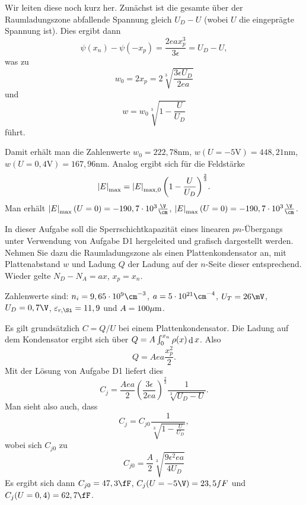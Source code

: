 \documentclass{article}
\begin{document}
\begin{solution}
Wir leiten diese noch kurz her. Zunächst ist die gesamte über der Raumladungszone abfallende Spannung gleich $U_D-U$ (wobei $U$ die eingeprägte Spannung ist). Dies ergibt dann
$$
\psi(x_n)-\psi(-x_p)=\frac{2eax_p^3}{3\epsilon}=U_D-U,
$$
was zu
$$w_0=2x_p=2\sqrt[3]{\frac{3\epsilon U_D}{2ea}}$$
und
$$w=w_0\sqrt[3]{1-\frac{U}{U_D}}$$
führt.

Damit erhält man die Zahlenwerte $w_0=222,78\mathrm{nm}$, $w(U=-5\mathrm{V})=448,21\mathrm{nm}$, $w(U=0,4\mathrm{V})=167,96\mathrm{nm}$.
Analog ergibt sich für die Feldstärke
$$\left|E\right|_{\max}=\left|E\right|_{\max,0}{\left(1-\frac{U}{U_D}\right)}^{\frac{2}{3}}.$$
Man erhält $\abs{E}_{\max} (U=0)=\float{-190,7}{3}\frac{\V}{\cm}$, $\abs{E}_{\max}(U=0)=\float{-190,7}{3}\frac{\V}{\cm}$.
\end{solution}

\begin{exercise}
In dieser Aufgabe soll die Sperrschichtkapazität eines linearen $pn$-Übergangs unter Verwendung von Aufgabe D1 hergeleited und grafisch dargestellt werden. Nehmen Sie dazu die Raumladungszone als einen Plattenkondensator an, mit Plattenabstand $w$ und Ladung $Q$ der Ladung auf der $n$-Seite dieser entsprechend.
Wieder gelte $N_D-N_A=ax$, $x_p=x_n$.

Zahlenwerte sind: $n_i=\float{9,65}{9}\cm^{-3}$, $a=\float{5}{21}\cm^{-4}$, $U_T=26\mV$, $U_D=0,7\V$, $\epsilon_{r,\Si}=11,9$ und $A=100\mathrm{\mu m}$.
\end{exercise}

\begin{solution}
Es gilt grundsätzlich $C=Q/U$ bei einem Plattenkondensator. 
Die Ladung auf dem Kondensator ergibt sich über $Q=A\int_{0}^{x_n}{\rho(x)}\mathop\mathrm{d}{x}$.
Also
$$
Q=Aea\frac{x_p^2}{2}.
$$
Mit der Lösung von Aufgabe D1 liefert dies
$$
C_j = \frac{Aea}{2}{\left(\frac{3\epsilon}{2ea}\right)}^{\frac{2}{3}}\frac{1}{\sqrt[3]{U_D-U}}.
$$
Man sieht also auch, dass
$$
C_j = C_{j0}\frac{1}{\sqrt[3]{1-\frac{U}{U_D}}},
$$
wobei sich $C_{j0}$ zu
$$
C_{j0}=\frac{A}{2}\sqrt[3]{\frac{9\epsilon^2ea}{4U_D}}
$$
Es ergibt sich dann $C_{j0}=47,3\fF$, $C_j(U=-5\V)=23,5fF$ und $C_j(U=0,4)=62,7\fF$.
\end{solution}
\end{document}
